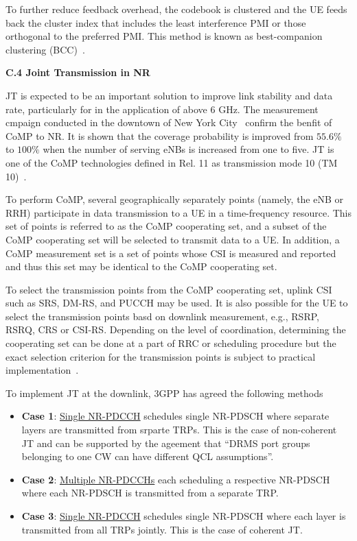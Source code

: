 \documentclass[a4paper,12pt]{article}%
\begin{document}
To further reduce feedback overhead, the codebook is clustered and the UE feeds back the cluster index that includes the least interference PMI or those orthogonal to the preferred PMI. This method is known as best-companion clustering (BCC)~\cite{bestcompanion_2}.



\noindent \textbf{C.4 Joint Transmission in NR}


JT is expected to be an important solution to improve link stability and data rate, particularly for in the application of above 6 GHz. The measurement cmpaign conducted in the downtown of New York City~\cite{Jr.RappaportGhosh2017} confirm the benfit of CoMP to NR. It is shown that the coverage probability is improved from $55.6\%$ to $100\%$ when the number of serving eNBs is increased from one to five. JT is one of the CoMP technologies defined in Rel. 11 as transmission mode 10 (TM 10)~\cite{TR36.819}.

To perform CoMP, several geographically separately points (namely, the eNB or RRH) participate in data transmission to a UE in a time-frequency resource. This set of points is referred to as the CoMP cooperating set, and a subset of the CoMP cooperating set will be selected to transmit data to a UE. In addition, a CoMP measurement set is a set of points whose CSI is measured and reported and thus this set may be identical to the CoMP cooperating set.


To select the transmission points from the CoMP cooperating set, uplink CSI such as SRS, DM-RS, and PUCCH may be used. It is also possible for the UE to select the transmission points basd on downlink measurement, e.g., RSRP, RSRQ, CRS or CSI-RS. Depending on the level of coordination, determining the cooperating set can be done at a part of RRC or scheduling procedure but the exact selection criterion for the transmission points is subject to practical implementation~\cite[5.2.3]{TR36.819}.

To implement JT at the downlink, 3GPP has agreed the following methods~\cite{RAN189Meeting}
\begin{itemize}
\item \textbf{Case 1}: \underline{Single NR-PDCCH} schedules single NR-PDSCH where separate layers are transmitted from srparte TRPs. This is the case of non-coherent JT and can be supported by the ageement that ``DRMS port groups belonging to one CW can have different QCL assumptions''.
\item \textbf{Case 2}: \underline{Multiple NR-PDCCHs} each scheduling a respective NR-PDSCH where each NR-PDSCH is transmitted from a separate TRP.
\item \textbf{Case 3}: \underline{Single NR-PDCCH} schedules single NR-PDSCH where each layer is transmitted from all TRPs jointly. This is the case of coherent JT.
\end{itemize}
\end{document}
